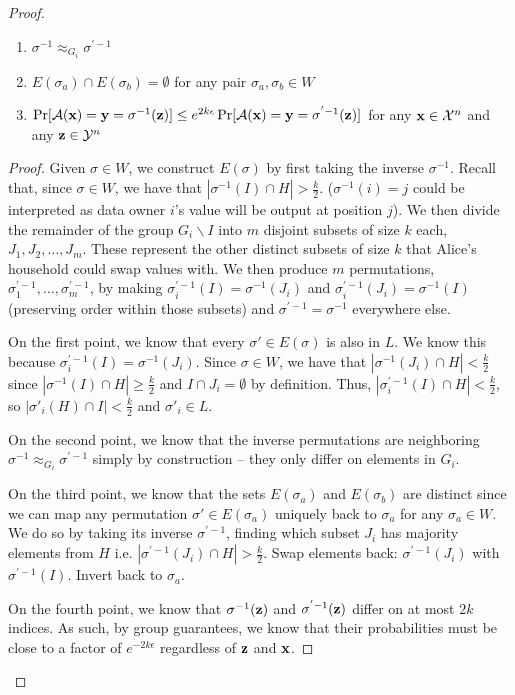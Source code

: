 \begin{proof}
\begin{lemma}
\begin{enumerate}
    \item $\sigma^{-1} \approx_{G_i} \sigma^{'-1}$ 
    \item $E(\sigma_a) \cap E(\sigma_b) = \emptyset$ for any pair $\sigma_a, \sigma_b \in W$
    \item $\Pr [\mathcal{A}(\mathbf{x}) = \mathbf{y} = \sigma^{-1}(\mathbf{z})] \leq e^{2k\epsilon} \Pr [\mathcal{A}(\mathbf{x}) = \mathbf{y} = \sigma^{'-1}(\mathbf{z})]$ for any $\mathbf{x} \in \mathcal{X}^n$ and any $\mathbf{z} \in \mathcal{Y}^n$
\end{enumerate}
\end{lemma}
\begin{proof}
Given $\sigma \in W$, we construct $E(\sigma)$ by first taking the inverse $\sigma^{-1}$. Recall that, since $\sigma \in W$, we have that $|\sigma^{-1}(I) \cap H| > \frac{k}{2}$. ($\sigma^{-1}(i) = j$ could be interpreted as data owner $i$'s \ldp value will be output at position $j$). We then divide the remainder of the group $G_i \backslash I$ into $m$ disjoint subsets of size $k$ each, $J_1, J_2, \dots, J_m$. These represent the other distinct subsets of size $k$ that Alice's household could swap \ldp values with. We then produce $m$ permutations, $\sigma^{'-1}_1, \dots, \sigma^{'-1}_m$, by making $\sigma^{'-1}_i(I) = \sigma^{-1}(J_i)$ and $\sigma^{'-1}_i(J_i) = \sigma^{-1}(I)$ (preserving order within those subsets) and $\sigma^{'-1} = \sigma^{-1}$ everywhere else. 

On the first point, we know that every $\sigma' \in E(\sigma)$ is also in $L$. We know this because $\sigma^{'-1}_i(I) = \sigma^{-1}(J_i)$. Since $\sigma \in W$, we have that $|\sigma^{-1}(J_i) \cap H| < \frac{k}{2}$ since $|\sigma^{-1}(I) \cap H| \geq \frac{k}{2}$ and $I \cap J_i = \emptyset$ by definition. Thus, $|\sigma^{'-1}_i(I) \cap H| < \frac{k}{2}$, so $|\sigma'_i(H) \cap I| < \frac{k}{2}$ and $\sigma'_i \in L$. 

On the second point, we know that the inverse permutations are neighboring $\sigma^{-1} \approx_{G_i} \sigma^{'-1}$ simply by construction -- they only differ on elements in $G_i$. 

On the third point, we know that the sets $E(\sigma_a)$ and $E(\sigma_b)$ are distinct since we can map any permutation $\sigma' \in E(\sigma_a)$ uniquely back to $\sigma_a$ for any $\sigma_a \in W$. We do so by taking its inverse $\sigma^{'-1}$, finding which subset $J_i$ has majority elements from $H$ i.e. $|\sigma^{'-1}(J_i) \cap H| > \frac{k}{2}$. Swap elements back: $\sigma^{'-1}(J_i)$ with $\sigma^{'-1}(I)$. Invert back to $\sigma_a$. 

On the fourth point, we know that $\sigma^{-1}(\mathbf{z})$ and $\sigma^{'-1}(\mathbf{z})$ differ on at most $2k$ indices. As such, by group \DP guarantees, we know that their probabilities must be close to a factor of $e^{-2k\epsilon}$ regardless of $\mathbf{z}$ and $\mathbf{x}$. 
\end{proof}


\end{proof}
